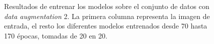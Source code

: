\begin{figure}[H]
\centering
    \caption{Resultados de entrenar los modelos sobre el conjunto de datos con \textit{data augmentation} 2. La primera columna representa la imagen de entrada, el resto los diferentes modelos entrenados desde 70 hasta 170 épocas, tomadas de 20 en 20.} 
\end{figure}

